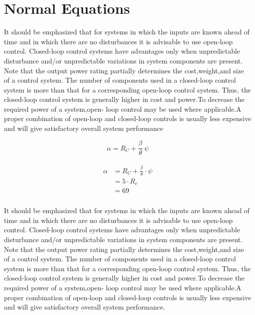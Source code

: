 \documentclass{report}
\begin{document}
\chapter{Normal Equations}

It should be emphasized that for systems in which the inputs are known ahead of time and in which there are no disturbances it is advisable to use open-loop control.  Closed-loop control systems have advantages only when unpredictable disturbance and/or unpredictable variations in system components are present. Note that the  output power rating partially determines the cost,weight,and size of a control system.  The number of components used in a closed-loop control system is more than that for  a corresponding open-loop control system. Thus, the closed-loop control system is  generally higher in cost and power.To decrease the required power of a system,open-  loop control may be used where applicable.A proper combination of open-loop and  closed-loop controls is usually less expensive and will give satisfactory overall system  performance

\begin{equation}
\alpha=R_{C} + \frac{\beta_{}}{\theta} \, \psi
\end{equation}

\begin{align}
\begin{split}
\alpha &= R_{C} + \frac{\beta_{}}{\theta} \cdot \psi\\
 &= 5 \cdot R_{c}\\
 &= 69\\
\end{split}
\end{align}

It should be emphasized that for systems in which the inputs are known ahead of time and in which there are no disturbances it is advisable to use open-loop control.  Closed-loop control systems have advantages only when unpredictable disturbance and/or unpredictable variations in system components are present. Note that the  output power rating partially determines the cost,weight,and size of a control system.  The number of components used in a closed-loop control system is more than that for  a corresponding open-loop control system. Thus, the closed-loop control system is  generally higher in cost and power.To decrease the required power of a system,open-  loop control may be used where applicable.A proper combination of open-loop and  closed-loop controls is usually less expensive and will give satisfactory overall system  performance.
\end{document}
